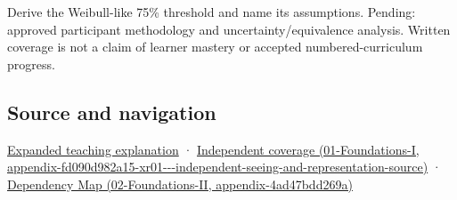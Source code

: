 Derive the Weibull-like 75\% threshold and name its assumptions. Pending: approved participant methodology and uncertainty/equivalence analysis. Written coverage is not a claim of learner mastery or accepted numbered-curriculum progress.

\subsection{Source and navigation}\label{appendix-1759f03e8ce7-source-and-navigation}

\hyperref[04-visual-computing-ii-ch042-a-threshold-is-evidence-from-a-procedure-not-a-universal-border]{Expanded teaching explanation} · \href{../01-Foundations-I/main.pdf\#nameddest=appendix-fd090d982a15-xr01---independent-seeing-and-representation-source}{Independent coverage (01-Foundations-I, appendix-fd090d982a15-xr01-\/-\/-independent-seeing-and-representation-source)} · \href{../02-Foundations-II/main.pdf\#nameddest=appendix-4ad47bdd269a}{Dependency Map (02-Foundations-II, appendix-4ad47bdd269a)}
